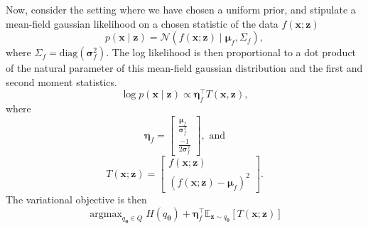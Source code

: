 \documentclass[11pt]{article}
\DeclareMathOperator*{\argmax}{argmax}
\begin{document}
Now, consider the setting where we have chosen a uniform prior, and stipulate a mean-field gaussian likelihood on a chosen statistic of the data $f(\mathbf{x}; \mathbf{z})$
\begin{equation}
p(\mathbf{x} \mid \mathbf{z}) = \mathcal{N}(f(\mathbf{x}; \mathbf{z}) \mid \bm{\mu}_f, \Sigma_f),
\end{equation}
where $\Sigma_f = \text{diag}(\bm{\sigma}_f^2)$.
The log likelihood is then proportional to a dot product of the natural parameter of this mean-field gaussian distribution and the first and second moment statistics.
\begin{equation}
\log p(\mathbf{x} \mid \mathbf{z}) \propto \bm{\eta}_f^\top T(\mathbf{x}, \mathbf{z}),
\end{equation}
where
\begin{equation} 
\label{eq:eta_f}
\bm{\eta}_{f} = \begin{bmatrix} \frac{\bm{\mu}_f}{\bm{\sigma}_f^2} \\ \frac{-1}{2\bm{\sigma}_f^2} \end{bmatrix}, \text{ and}
\end{equation}
\begin{equation}
T(\mathbf{x}; \mathbf{z}) = \begin{bmatrix} f(\mathbf{x}; \mathbf{z}) \\ \left( f(\mathbf{x}; \mathbf{z}) - \bm{\mu}_f \right)^2 \end{bmatrix}.
\end{equation}
The variational objective is then
\begin{equation}
\label{eq:VI_obj}
\argmax_{q_{\bm{\theta}} \in Q} H(q_{\bm{\theta}}) + \bm{\eta}_f^\top \mathbb{E}_{\mathbf{z} \sim q_{\bm{\theta}}}\left[ T(\mathbf{x}; \mathbf{z}) \right]
\end{equation}
\end{document}

